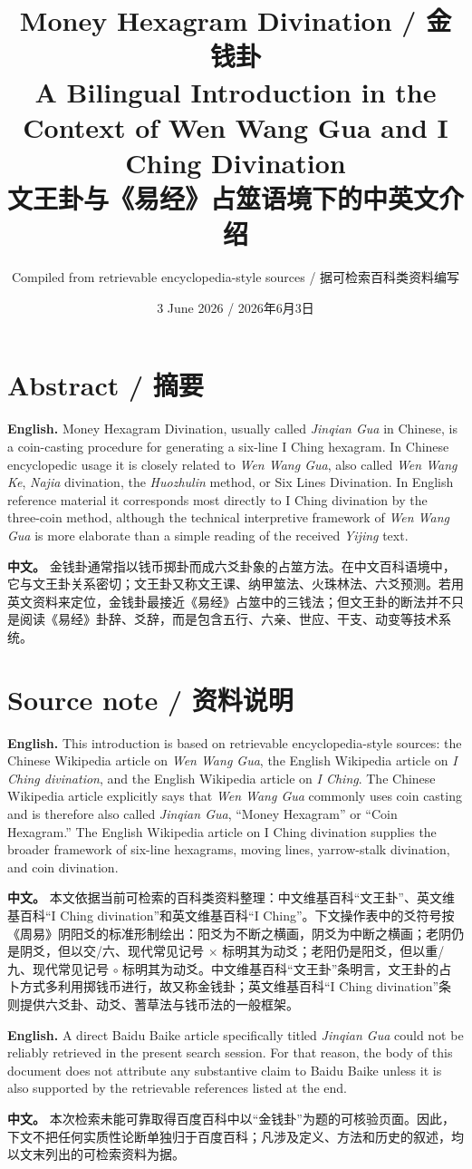 \documentclass[11pt]{article}
\title{Money Hexagram Divination / 金钱卦\\\large A Bilingual Introduction in the Context of Wen Wang Gua and I Ching Divination\\文王卦与《易经》占筮语境下的中英文介绍}
\author{Compiled from retrievable encyclopedia-style sources / 据可检索百科类资料编写}
\date{3 June 2026 / 2026年6月3日}
\newcommand{\EN}[1]{\textcolor{labelgray}{\textbf{English.}} #1}
\newcommand{\CN}[1]{\textcolor{labelgray}{\textbf{中文。}} #1}
\newcommand{\bipar}[2]{\EN{#1}\par\CN{#2}\par\medskip}
\begin{document}
\maketitle

\section*{Abstract / 摘要}
\bipar{Money Hexagram Divination, usually called \textit{Jinqian Gua} in Chinese, is a coin-casting procedure for generating a six-line I Ching hexagram. In Chinese encyclopedic usage it is closely related to \textit{Wen Wang Gua}, also called \textit{Wen Wang Ke}, \textit{Najia} divination, the \textit{Huozhulin} method, or Six Lines Divination. In English reference material it corresponds most directly to I Ching divination by the three-coin method, although the technical interpretive framework of \textit{Wen Wang Gua} is more elaborate than a simple reading of the received \textit{Yijing} text.}{金钱卦通常指以钱币掷卦而成六爻卦象的占筮方法。在中文百科语境中，它与文王卦关系密切；文王卦又称文王课、纳甲筮法、火珠林法、六爻预测。若用英文资料来定位，金钱卦最接近《易经》占筮中的三钱法；但文王卦的断法并不只是阅读《易经》卦辞、爻辞，而是包含五行、六亲、世应、干支、动变等技术系统。}

\section{Source note / 资料说明}
\bipar{This introduction is based on retrievable encyclopedia-style sources: the Chinese Wikipedia article on \textit{Wen Wang Gua}, the English Wikipedia article on \textit{I Ching divination}, and the English Wikipedia article on \textit{I Ching}. The Chinese Wikipedia article explicitly says that \textit{Wen Wang Gua} commonly uses coin casting and is therefore also called \textit{Jinqian Gua}, ``Money Hexagram'' or ``Coin Hexagram.'' The English Wikipedia article on I Ching divination supplies the broader framework of six-line hexagrams, moving lines, yarrow-stalk divination, and coin divination.}{本文依据当前可检索的百科类资料整理：中文维基百科“文王卦”、英文维基百科“I Ching divination”和英文维基百科“I Ching”。下文操作表中的爻符号按《周易》阴阳爻的标准形制绘出：阳爻为不断之横画，阴爻为中断之横画；老阴仍是阴爻，但以交/六、现代常见记号 $\times$ 标明其为动爻；老阳仍是阳爻，但以重/九、现代常见记号 $\circ$ 标明其为动爻。中文维基百科“文王卦”条明言，文王卦的占卜方式多利用掷钱币进行，故又称金钱卦；英文维基百科“I Ching divination”条则提供六爻卦、动爻、蓍草法与钱币法的一般框架。}
\bipar{A direct Baidu Baike article specifically titled \textit{Jinqian Gua} could not be reliably retrieved in the present search session. For that reason, the body of this document does not attribute any substantive claim to Baidu Baike unless it is also supported by the retrievable references listed at the end.}{本次检索未能可靠取得百度百科中以“金钱卦”为题的可核验页面。因此，下文不把任何实质性论断单独归于百度百科；凡涉及定义、方法和历史的叙述，均以文末列出的可检索资料为据。}
\end{document}

